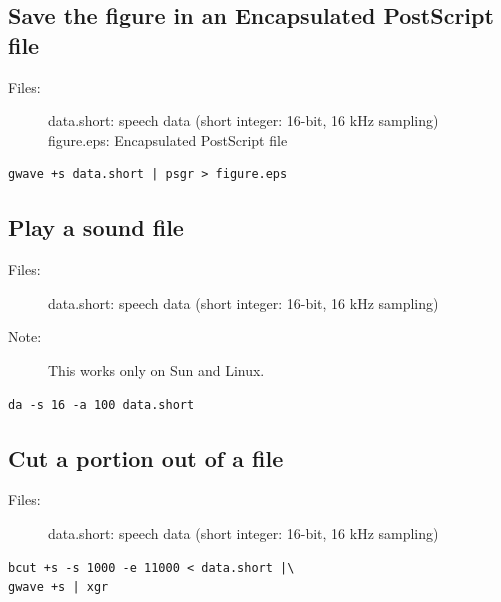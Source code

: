 \documentclass[a4paper,10pt]{article}
\begin{document}
\subsection{Save the figure in an Encapsulated PostScript file}

\begin{description}
\item[Files:]
  data.short: speech data (short integer: 16-bit, 16 kHz sampling)\\
  figure.eps: Encapsulated PostScript file
\end{description}

\begin{verbatim}
gwave +s data.short | psgr > figure.eps
\end{verbatim}

\subsection{Play a sound file}

\begin{description}
\item[Files:]
  data.short: speech data (short integer: 16-bit, 16 kHz sampling)
\item[Note:]
  This works only on Sun and Linux.
\end{description}

\begin{verbatim}
da -s 16 -a 100 data.short
\end{verbatim}

\subsection{Cut a portion out of a file}

\begin{description}
\item[Files:]
  data.short: speech data (short integer: 16-bit, 16 kHz sampling)
\end{description}

\begin{verbatim}
bcut +s -s 1000 -e 11000 < data.short |\
gwave +s | xgr
\end{verbatim}
\end{document}
